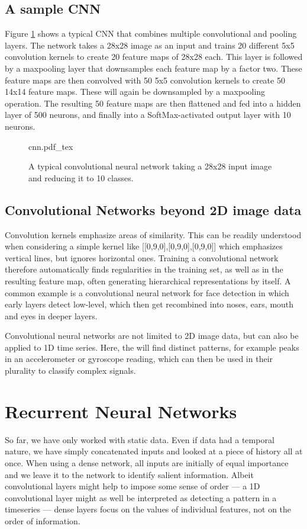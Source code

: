 \subsection{A sample CNN}

Figure \ref{fig:cnn} shows a typical CNN that combines multiple convolutional and pooling layers. The network takes a 28x28 image as an input and trains 20 different 5x5 convolution kernels to create 20 feature maps of 28x28 each. This layer is followed by a maxpooling layer that downsamples each feature map by a factor two. These feature maps are then convolved with 50 5x5 convolution kernels to create 50 14x14 feature maps. These will again be downsampled by a maxpooling operation. The resulting 50 feature maps are then flattened and fed into a hidden layer of 500 neurons, and finally into a SoftMax-activated output layer with 10 neurons.

\begin{figure}[htb]
\tiny
    \centering
    \def\svgwidth{\textwidth}
    {cnn.pdf_tex}
    \caption{A typical convolutional neural network taking a 28x28 input image and reducing it to 10 classes.\label{fig:cnn}}
\end{figure}


\subsection{Convolutional Networks beyond 2D image data}

Convolution kernels emphasize areas of similarity. This can be readily understood when considering a simple kernel like [[0,9,0],[0,9,0],[0,9,0]] which emphasizes vertical lines, but ignores horizontal ones. Training a convolutional network therefore automatically finds regularities in the training set, as well as in the resulting feature map, often generating hierarchical representations by itself. A common example is a convolutional neural network for face detection in which early layers detect low-level, which then get recombined into noses, ears, mouth and eyes in deeper layers.

Convolutional neural networks are not limited to 2D image data, but can also be applied to 1D time series. Here, the will find distinct patterns, for example peaks in an accelerometer or gyroscope reading, which can then be used in their plurality to classify complex signals. 

\section{Recurrent Neural Networks}
So far, we have only worked with static data. Even if data had a temporal nature, we have simply concatenated inputs and looked at a piece of history all at once. When using a dense network, all inputs are initially of equal importance and we leave it to the network to identify salient information. Albeit convolutional layers might help to impose some sense of order --- a 1D convolutional layer might as well be interpreted as detecting a pattern in a timeseries --- dense layers focus on the values of individual features, not on the order of information. 

